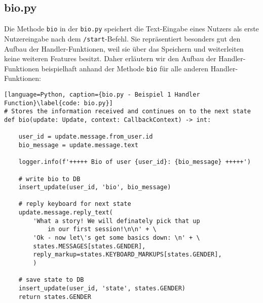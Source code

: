         \subsection{bio.py} \label{Implementierung: bio.py}
                Die Methode \verb|bio| in der \verb|bio.py| speichert die Text-Eingabe eines Nutzers als erste Nutzereingabe nach dem \verb|/start|-Befehl. Sie repräsentiert besonders gut den Aufbau der Handler-Funktionen, weil sie über das Speichern und weiterleiten keine weiteren Features besitzt. Daher erläutern wir den Aufbau der Handler-Funktionen beispielhaft anhand der Methode \verb|bio| für alle anderen Handler-Funktionen:

                \begin{lstlisting}[language=Python, caption={bio.py - Beispiel 1 Handler Function}\label{code: bio.py}]
# Stores the information received and continues on to the next state
def bio(update: Update, context: CallbackContext) -> int:
    
    user_id = update.message.from_user.id
    bio_message = update.message.text
    
    logger.info(f'+++++ Bio of user {user_id}: {bio_message} +++++')

    # write bio to DB
    insert_update(user_id, 'bio', bio_message)

    # reply keyboard for next state
    update.message.reply_text(
        'What a story! We will definately pick that up 
            in our first session!\n\n' + \
        'Ok - now let\'s get some basics down: \n' + \
        states.MESSAGES[states.GENDER],
        reply_markup=states.KEYBOARD_MARKUPS[states.GENDER],
        )

    # save state to DB
    insert_update(user_id, 'state', states.GENDER)
    return states.GENDER
                    \end{lstlisting}

